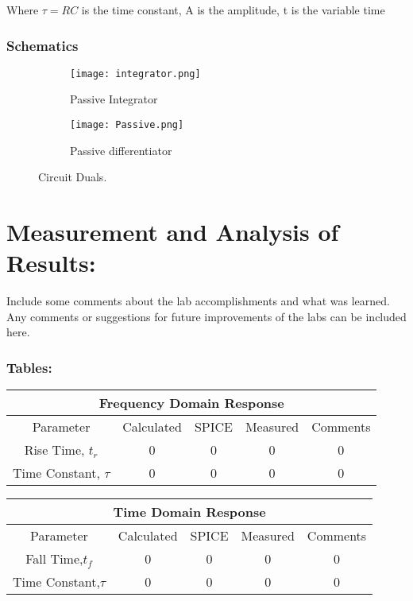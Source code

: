 \documentclass[10pt,a4paper,draft]{article}
\begin{document}
Where $\tau = RC $ is the time constant, A is the amplitude, t is the variable time \



\section{Schematics}
\begin{figure}
  \begin{subfigure}[b]{0.4\textwidth}
    \texttt{[image: integrator.png]}
    \caption{Passive Integrator}
  
  \end{subfigure}
  \hfill
  \begin{subfigure}[b]{0.4\textwidth}
    \texttt{[image: Passive.png]}
    \caption{Passive differentiator}

  \end{subfigure}
  \caption{Circuit Duals.}
\end{figure}



\part*{Measurement and Analysis of Results:}
Include some comments  about   the lab accomplishments and what was learned. Any comments or suggestions for future improvements of the labs can be included here.
\section{Tables:}
\begin{center}
\begin{tabular}{|c||c|c|c|c|}
\hline
\multicolumn{5}{|c|}{Frequency Domain Response } \\ 
\hline 
Parameter & Calculated  & SPICE & Measured & Comments \\ 
\hline 
Rise Time, $t_{r}$ & 0 & 0 & 0 & 0 \\ 
\hline 
Time Constant, $\tau$ & 0 & 0 & 0 & 0 \\ 
\hline 
\end{tabular} 
\end{center}

\begin{center}
\begin{tabular}{|c||c|c|c|c|}
\hline 
\multicolumn{5}{|c|}{Time Domain Response } \\ 
\hline 
Parameter & Calculated  & SPICE & Measured  & Comments \\ 
\hline 
Fall Time,$t_{f}$ & 0 & 0 & 0 & 0 \\ 
\hline 
Time Constant,$\tau$ & 0 & 0 & 0 & 0 \\ 
\hline 
\end{tabular} 
\end{center}
\end{document}
